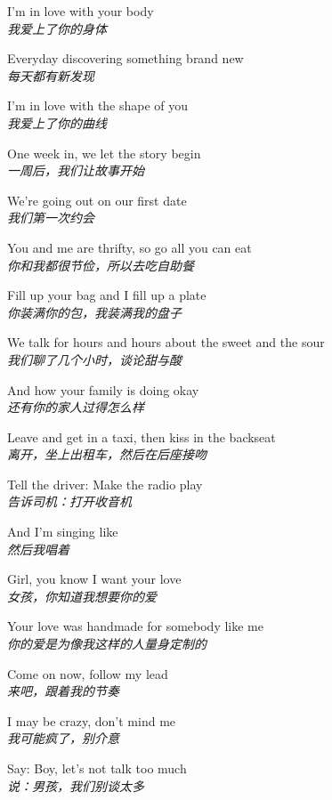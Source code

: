 \begin{spacing}{1.5}
\begin{flushleft}
I'm in love with your body\\
\textit{我爱上了你的身体}\lyricspace

Everyday discovering something brand new\\
\textit{每天都有新发现}\lyricspace

I'm in love with the shape of you\\
\textit{我爱上了你的曲线}\lyricspace

One week in, we let the story begin\\
\textit{一周后，我们让故事开始}\lyricspace

We're going out on our first date\\
\textit{我们第一次约会}\lyricspace

You and me are thrifty, so go all you can eat\\
\textit{你和我都很节俭，所以去吃自助餐}\lyricspace

Fill up your bag and I fill up a plate\\
\textit{你装满你的包，我装满我的盘子}\lyricspace

We talk for hours and hours about the sweet and the sour\\
\textit{我们聊了几个小时，谈论甜与酸}\lyricspace

And how your family is doing okay\\
\textit{还有你的家人过得怎么样}\lyricspace

Leave and get in a taxi, then kiss in the backseat\\
\textit{离开，坐上出租车，然后在后座接吻}\lyricspace

Tell the driver: Make the radio play\\
\textit{告诉司机：打开收音机}\lyricspace

And I'm singing like\\
\textit{然后我唱着}\lyricspace

Girl, you know I want your love\\
\textit{女孩，你知道我想要你的爱}\lyricspace

Your love was handmade for somebody like me\\
\textit{你的爱是为像我这样的人量身定制的}\lyricspace

Come on now, follow my lead\\
\textit{来吧，跟着我的节奏}\lyricspace

I may be crazy, don't mind me\\
\textit{我可能疯了，别介意}\lyricspace

Say: Boy, let's not talk too much\\
\textit{说：男孩，我们别谈太多}\lyricspace


\end{flushleft}
\end{spacing}

